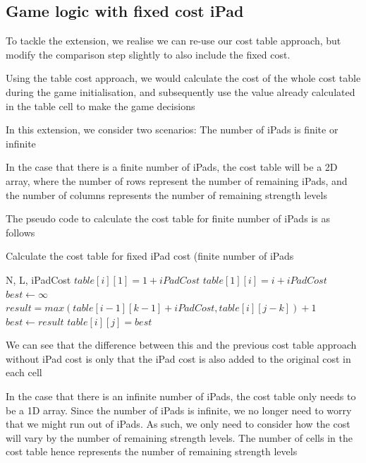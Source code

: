 \documentclass[12pt,a4paper,oneside]{report}
\begin{document}
\subsection{Game logic with fixed cost iPad}

To tackle the extension, we realise we can re-use our cost table approach, but modify the comparison step slightly to also include the fixed cost. 

Using the table cost approach, we would calculate the cost of the whole cost table during the game initialisation, and subsequently use the value already calculated in the table cell to make the game decisions

In this extension, we consider two scenarios: The number of iPads is finite or infinite

In the case that there is a finite number of iPads, the cost table will be a 2D array, where the number of rows represent the number of remaining iPads, and the number of columns represents the number of remaining strength levels

The pseudo code to calculate the cost table for finite number of iPads is as follows

\begin{algorithm}[H]
\caption{Calculate the cost table for fixed iPad cost (finite number of iPads}
\begin{algorithmic}[1]
\REQUIRE N, L, iPadCost
	\STATE $table[i][1] = 1+iPadCost$
\ENDFOR
{}
	\STATE $table[1][i] = i+iPadCost$
\ENDFOR
{}
		\STATE $best \leftarrow \infty$
			\STATE $result = max(table[i - 1][k - 1]+iPadCost, table[i][j - k]) + 1$
				\STATE $best \leftarrow result$
			\ENDIF
		\ENDFOR
		\STATE $table[i][j] = best$
	\ENDFOR
\ENDFOR
\end{algorithmic}
\end{algorithm}

We can see that the difference between this and the previous cost table approach without iPad cost is only that the iPad cost is also added to the original cost in each cell

In the case that there is an infinite number of iPads, the cost table only needs to be a 1D array. Since the number of iPads is infinite, we no longer need to worry that we might run out of iPads. As such, we only need to consider how the cost will vary by the number of remaining strength levels. The number of cells in the cost table hence represents the number of remaining strength levels
\end{document}
